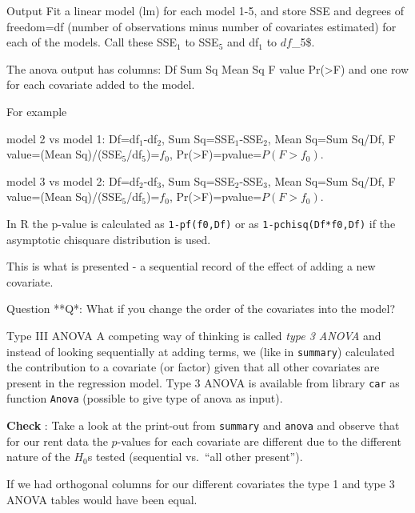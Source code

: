 \documentclass[
  ignorenonframetext,
]{beamer}
\begin{document}
\begin{frame}[fragile]{Output}
\label{output}
Fit a linear model (lm) for each model 1-5, and store SSE and degrees of
freedom=df (number of observations minus number of covariates estimated)
for each of the models. Call these SSE\(_1\) to SSE\(_5\) and df\(_1\)
to \(df\)\_5\$.

The anova output has columns: Df Sum Sq Mean Sq F value
Pr(\textgreater F) and one row for each covariate added to the model.

For example

model 2 vs model 1: Df=df\(_1\)-df\(_2\), Sum Sq=SSE\(_1\)-SSE\(_2\),
Mean Sq=Sum Sq/Df, F value=(Mean Sq)/(SSE\(_5\)/df\(_5\))=\(f_0\),
Pr(\textgreater F)=pvalue=\(P(F>f_0)\).

model 3 vs model 2: Df=df\(_2\)-df\(_3\), Sum Sq=SSE\(_2\)-SSE\(_3\),
Mean Sq=Sum Sq/Df, F value=(Mean Sq)/(SSE\(_5\)/df\(_5\))=\(f_0\),
Pr(\textgreater F)=pvalue=\(P(F>f_0)\).

In R the p-value is calculated as \texttt{1-pf(f0,Df)} or as
\texttt{1-pchisq(Df*f0,Df)} if the asymptotic chisquare distribution is
used.

This is what is presented - a sequential record of the effect of adding
a new covariate.
\end{frame}

\begin{frame}{Question}
\label{question-1}
**Q*: What if you change the order of the covariates into the model?
\end{frame}

\begin{frame}[fragile]{Type III ANOVA}
\label{type-iii-anova}
A competing way of thinking is called \emph{type 3 ANOVA} and instead of
looking sequentially at adding terms, we (like in \texttt{summary})
calculated the contribution to a covariate (or factor) given that all
other covariates are present in the regression model. Type 3 ANOVA is
available from library \texttt{car} as function \texttt{Anova} (possible
to give type of anova as input).

\textbf{Check} : Take a look at the print-out from \texttt{summary} and
\texttt{anova} and observe that for our rent data the \(p\)-values for
each covariate are different due to the different nature of the \(H_0\)s
tested (sequential vs.~``all other present'').

If we had orthogonal columns for our different covariates the type 1 and
type 3 ANOVA tables would have been equal.
\end{frame}
\end{document}
